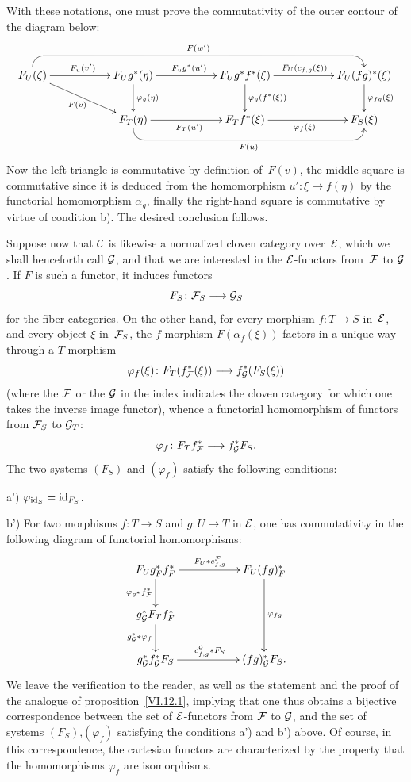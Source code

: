 With these notations, one must prove the commutativity of the outer
contour of the diagram below:
$$
\xymatrix{ F_U(\zeta) \ar@{-<} `u[r] `[rrrrrr]^{F(w')} [rrrrrr]
\ar[rr]^{F_u(v')} \ar[drr]_{F(v)} & & F_Ug^*(\eta)
\ar[rr]^{F_ug^*(u')} \ar[d]^{\varphi_g(\eta)} & & F_Ug^*f^*(\xi)
\ar[rr]^{F_U(c_{f,g}(\xi))}\ar[d]^{\varphi_g(f^*(\xi))}& &
F_U(fg)^*(\xi) \ar[d]^{\varphi_{fg}(\xi)} \\ & & F_T(\eta) \ar@{-<}
`d[r] `[rrrr]_{F(u)} [rrrr] \ar[rr]_{F_T(u')} & & F_Tf^*(\xi)
\ar[rr]_{\varphi_f(\xi)} & & F_S(\xi) }
$$
Now the left triangle is commutative by definition of~$F(v)$, the
middle square is commutative since it is deduced from the homomorphism
$u'\colon \xi\to f(\eta)$ by the functorial homomorphism $\alpha_g$,
finally the right-hand square is commutative by virtue of condition
b). The desired conclusion follows.

Suppose now that $\cal{C}$ is likewise a
normalized cloven category over~$\cal{E}$, which we
shall henceforth call $\cal{G}$, and that we are interested
in the $\cal{E}$-functors from~$\cal{F}$ to $\cal{G}$. If $F$ is such a
functor, it induces functors
$$
F_S\colon \cal{F}_S\to\cal{G}_S
$$
for the fiber-categories. On the other hand, for every morphism
$f\colon T\to S$ in~$\cal{E}$, and every object $\xi$ in~$\cal{F}_S$,
the $f$-morphism $F(\alpha_f(\xi))$ factors in a unique way
through a $T$-morphism
$$
\varphi_f(\xi)\colon F_T(f^*_{\cal{F}}(\xi))\to
f^*_{\cal{G}}(F_S(\xi))
$$
(where the $\cal{F}$ or the $\cal{G}$ in the index indicates the
cloven category for which one takes the inverse image
functor), whence a functorial homomorphism of functors from
$\cal{F}_S$ to $\cal{G}_T$:
$$
\varphi_f\colon F_T f^*_{\cal{F}}\to f^*_{\cal{G}}F_S.
$$
The two systems $(F_S)$ and $(\varphi_f)$ satisfy the
following conditions:

a') $\varphi_{\id_S}=\id_{F_S}$.

b') For two morphisms $f\colon T\to S$ and $g\colon U\to T$ in
$\cal{E}$, one has commutativity in the following diagram of functorial
homomorphisms:
$$
\xymatrix{ F_Ug_F^*f_F^* \ar[rr]^{F_U *c_{f,g}^\cal{F}}
\ar[d]_{\varphi_{g^*}f^*_{\cal{F}}} & & F_U(fg)^*_F
\ar[dd]^{\varphi_{fg}} \\ g^*_{\cal{G}}F_Tf^*_F
\ar[d]_{g^*_{\cal{G}}*\varphi_f} & & \\ g^*_{\cal{G}}f^*_{\cal{G}}F_S
\ar[rr]^{c_{f,g}^\cal{G}*F_S} & & (fg)^*_{\cal{G}}F_S. }
$$
We leave the verification to the reader, as well as
the statement and the proof of the analogue of
proposition~\ref{VI.12.1}, implying that one thus obtains a
bijective correspondence between the set of $\cal{E}$-functors from
$\cal{F}$ to $\cal{G}$, and the set of systems
$(F_S)$,$(\varphi_f)$ satisfying the conditions a') and b')
above. Of course, in this correspondence, the cartesian
functors are characterized by the property that
the homomorphisms $\varphi_f$ are isomorphisms.


